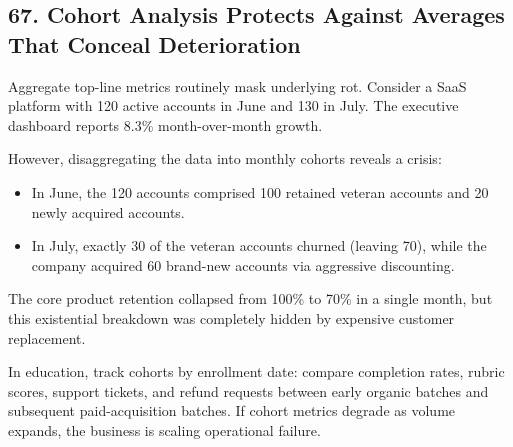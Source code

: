 \subsection*{67. Cohort Analysis Protects Against Averages That Conceal Deterioration}

Aggregate top-line metrics routinely mask underlying rot. Consider a SaaS platform with 120 active accounts in June and 130 in July. The executive dashboard reports 8.3\% month-over-month growth.

However, disaggregating the data into monthly cohorts reveals a crisis:
\begin{itemize}
    \item In June, the 120 accounts comprised 100 retained veteran accounts and 20 newly acquired accounts.
    \item In July, exactly 30 of the veteran accounts churned (leaving 70), while the company acquired 60 brand-new accounts via aggressive discounting.
\end{itemize}

The core product retention collapsed from 100\% to 70\% in a single month, but this existential breakdown was completely hidden by expensive customer replacement.

In education, track cohorts by enrollment date: compare completion rates, rubric scores, support tickets, and refund requests between early organic batches and subsequent paid-acquisition batches. If cohort metrics degrade as volume expands, the business is scaling operational failure.
